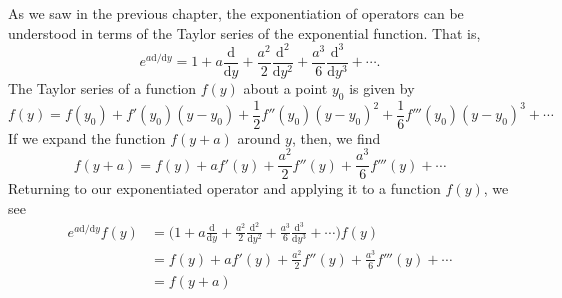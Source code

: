 \documentclass[../the-road-to-reality.tex]{subfiles}
\begin{document}
\begin{questions}
\begin{solution}
  As we saw in the previous chapter, the exponentiation of operators can be
  understood in terms of the Taylor series of the exponential function. That is,
  \[
    e^{a\mathrm{d}/\mathrm{d}y} = 1 + a\frac{\mathrm{d}}{\mathrm{d}y} +
    \frac{a^2}{2}\frac{\mathrm{d}^2}{\mathrm{d}y^2} +
    \frac{a^3}{6}\frac{\mathrm{d}^3}{\mathrm{d}y^3} + \cdots.
  \]
  The Taylor series of a function $f(y)$ about a point $y_0$ is given by
  \[
    f(y) = f(y_0) + f'(y_0)(y-y_0) + \frac{1}{2}f''(y_0)(y-y_0)^2 +
    \frac{1}{6}f'''(y_0)(y-y_0)^3 + \cdots
  \]
  If we expand the function $f(y+a)$ around $y$, then, we find
  \[
    f(y+a) = f(y) + af'(y) + \frac{a^2}{2}f''(y) + \frac{a^3}{6}f'''(y) + \cdots
  \]
  Returning to our exponentiated operator and applying it to a function $f(y)$,
  we see
  \begin{align*}
    e^{a\mathrm{d}/\mathrm{d}y}f(y) &= \Big(1 + a\frac{\mathrm{d}}{\mathrm{d}y} +
    \frac{a^2}{2}\frac{\mathrm{d}^2}{\mathrm{d}y^2} +
                                      \frac{a^3}{6}\frac{\mathrm{d}^3}{\mathrm{d}y^3} + \cdots\Big)f(y) \\
                                    &= f(y) + af'(y) + \frac{a^2}{2}f''(y) + \frac{a^3}{6}f'''(y) + \cdots \\
    &= f(y + a)
  \end{align*}
\end{solution}


\end{questions}
\end{document}
